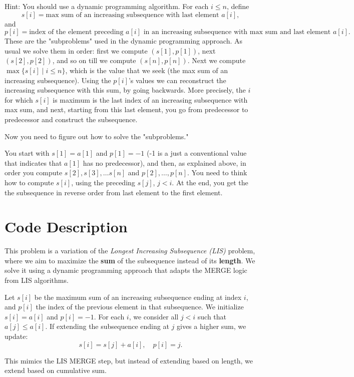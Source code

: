 \documentclass[11pt]{article}
\begin{document}
Hint: You should use a dynamic programming algorithm. For each $i \le n$, define
\[
s[i] = \text{max sum of an increasing subsequence with last element } a[i],
\]
and
\[
p[i] = \text{index of the element preceding } a[i] \text{ in an increasing subsequence with max sum and last element } a[i].
\]
These are the "subproblems" used in the dynamic programming approach. As usual we solve them in order: first we compute $(s[1], p[1])$, next $(s[2], p[2])$, and so on till we compute $(s[n], p[n])$. Next we compute $\max\{s[i] \mid i \le n\}$, which is the value that we seek (the max sum of an increasing subsequence). Using the $p[i]$'s values we can reconstruct the increasing subsequence with this sum, by going backwards. More precisely, the $i$ for which $s[i]$ is maximum is the last index of an increasing subsequence with max sum, and next, starting from this last element, you go from predecessor to predecessor and construct the subsequence.

Now you need to figure out how to solve the "subproblems."

You start with $s[1] = a[1]$ and $p[1] = -1$ (-1 is a just a conventional value that indicates that $a[1]$ has no predecessor), and then, as explained above, in order you compute $s[2], s[3], \ldots s[n]$ and $p[2], \ldots, p[n]$. You need to think how to compute $s[i]$, using the preceding $s[j]$, $j < i$. At the end, you get the the subsequence in reverse order from last element to the first element.
\newpage

\section*{Code Description}

This problem is a variation of the \textit{Longest Increasing Subsequence (LIS)} problem, where we aim to maximize the \textbf{sum} of the subsequence instead of its \textbf{length}. We solve it using a dynamic programming approach that adapts the MERGE logic from LIS algorithms.

Let $s[i]$ be the maximum sum of an increasing subsequence ending at index $i$, and $p[i]$ the index of the previous element in that subsequence. We initialize $s[i] = a[i]$ and $p[i] = -1$. For each $i$, we consider all $j < i$ such that $a[j] \le a[i]$. If extending the subsequence ending at $j$ gives a higher sum, we update:
\[
s[i] = s[j] + a[i], \quad p[i] = j.
\]

This mimics the LIS MERGE step, but instead of extending based on length, we extend based on cumulative sum.
\end{document}
